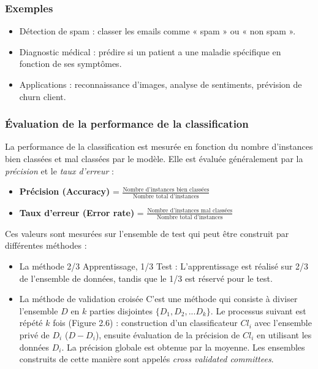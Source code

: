 \documentclass[a4paper,12pt]{report}
\begin{document}
        \subsubsection*{Exemples}

        \begin{itemize}
            \item  Détection de spam : classer les emails comme « spam » ou « non spam ».
            \item  Diagnostic médical : prédire si un patient a une maladie spécifique en fonction de ses symptômes.
            \item  Applications : reconnaissance d’images, analyse de sentiments, prévision de churn client.
        \end{itemize}

        \subsubsection{Évaluation de la performance de la classification}

        La performance de la classification est mesurée en fonction du nombre d'instances bien classées et mal classées par le modèle. Elle est évaluée généralement par la \textit{précision} et le \textit{taux d'erreur} :
        
        \begin{itemize}
            \item \textbf{Précision (Accuracy)} = $\frac{\text{Nombre d'instances bien classées}}{\text{Nombre total d'instances}}$
            \item \textbf{Taux d'erreur (Error rate)} = $\frac{\text{Nombre d'instances mal classées}}{\text{Nombre total d'instances}}$
        \end{itemize}
        
        Ces valeurs sont mesurées sur l'ensemble de test qui peut être construit par différentes méthodes :

         \begin{itemize}
            \item  {La méthode 2/3 Apprentissage, 1/3 Test} :  L'apprentissage est réalisé sur 2/3 de l'ensemble de données, tandis que le 1/3 est réservé pour le test.
            \item  {La méthode de validation croisée}   C'est une méthode qui consiste à diviser l'ensemble $D$ en $k$ parties disjointes $\{D_1, D_2, ... D_k\}$. Le processus suivant est répété $k$ fois (Figure 2.6) : construction d'un classificateur $Cl_i$ avec l'ensemble privé de $D_i$ ($D - D_i$), ensuite évaluation de la précision de $Cl_i$ en utilisant les données $D_i$. La précision globale est obtenue par la moyenne. Les ensembles construits de cette manière sont appelés \textit{cross validated committees}.
        \end{itemize}
  
\end{document}
